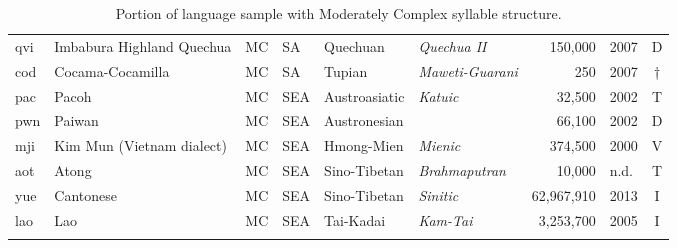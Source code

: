 \begin{table}
\begin{tabularx}{\textwidth}{lQllQQrlc}
 qvi & {{Imbabura Highland Quechua}} & MC & SA & {Quechuan} & {\textit{Quechua II}} &  150,000 & 2007 & D\\
 cod & {{Cocama-Cocamilla}} & MC & SA & {Tupian} & {\textit{Maweti-Guarani}} &  250 & 2007 & †\\
 pac & {{Pacoh}} & MC & SEA  & {Austroasiatic} & {\textit{Katuic}} &  32,500 & 2002 & T\\
 pwn & {{Paiwan}} & MC & SEA  & {Austronesian} &  &  66,100 & 2002 & D\\
 mji & {{Kim Mun (Vietnam dialect)}} & MC & SEA  & {Hmong-Mien} & {\textit{Mienic}} &  374,500 & 2000 & V\\
 aot & {{Atong}} & MC & SEA  & {Sino-Tibetan} & {\textit{Brahmaputran}} &  10,000 & n.d. & T\\
 yue & {{Cantonese}} & MC & SEA  & {Sino-Tibetan} & {\textit{Sinitic}} &  62,967,910 & 2013 & I\\
 lao & {{Lao}} & MC & SEA  & {Tai-Kadai} & {\textit{Kam-Tai}} &  3,253,700 & 2005 & I\\
\lspbottomrule
\end{tabularx}
\caption{Portion of language sample with Moderately Complex syllable structure.\label{tab:A.2}}
\end{table}


